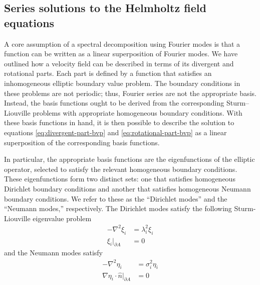 \documentclass[draft]{agujournal2019}
\begin{document}
\subsection{Series solutions to the Helmholtz field equations} \label{sec:Spectral decomposition}
A core assumption of a spectral decomposition using Fourier modes is that a function can be written as a linear superposition of Fourier modes. We have outlined how a velocity field can be described in terms of its divergent and rotational parts. Each part is defined by a function that satisfies an inhomogeneous elliptic boundary value problem. The boundary conditions in these problems are not periodic; thus, Fourier series are not the appropriate basis. Instead, the basis functions ought to be derived from the corresponding Sturm–Liouville problems with appropriate homogeneous boundary conditions. With these basis functions in hand, it is then possible to describe the solution to equations \eqref{eq:divergent-part-bvp} and \eqref{eq:rotational-part-bvp} as a linear superposition of the corresponding basis functions.

In particular, the appropriate basis functions are the eigenfunctions of the elliptic operator, selected to satisfy the relevant homogeneous boundary conditions. These eigenfunctions form two distinct sets: one that satisfies homogeneous Dirichlet boundary conditions and another that satisfies homogeneous Neumann boundary conditions. We refer to these as the “Dirichlet modes” and the “Neumann modes,” respectively. The Dirichlet modes satisfy the following Sturm-Liouville eigenvalue problem
\begin{subequations}
    \begin{align}
        -\nabla^2 \xi_i &= \lambda_i^2 \xi_i \label{eq:dirichlet mode field equation}\\
        \xi_i|_{\partial A} &= 0 \label{eq:dirichlet mode boundary condition}
    \end{align} \label{eq:dirichlet-mode-bvp}
\end{subequations}
and the Neumann modes satisfy 
\begin{subequations}
    \begin{align}
        -\nabla^2 \eta_i &= \sigma_i^2 \eta_i \label{eq:neumann mode field equation} \\
        \nabla \eta_i \cdot \hat{n} |_{\partial A} &= 0 \label{eq:neumann mode boundary condition}
    \end{align}\label{eq:neumann-mode-bvp}
\end{subequations}
\end{document}
